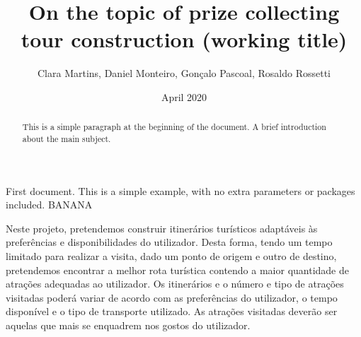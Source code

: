 \documentclass{article}
\title{On the topic of prize collecting tour construction (working title)}
\author{Clara Martins, Daniel Monteiro, Gonçalo Pascoal, Rosaldo Rossetti}
\date{April 2020}
\begin{document}
\maketitle

\begin{abstract}
This is a simple paragraph at the beginning of the 
document. A brief introduction about the main subject.
\end{abstract}

First document. This is a simple example, with no 
extra parameters or packages included. BANANA

Neste projeto, pretendemos construir itinerários turísticos adaptáveis às preferências e disponibilidades do utilizador. Desta forma, tendo um tempo limitado para realizar a visita, dado um ponto de origem e outro de destino, pretendemos encontrar a melhor rota turística contendo a maior quantidade de atrações adequadas ao utilizador.
    Os itinerários e o número e tipo de atrações visitadas poderá variar de acordo com as preferências do utilizador, o tempo disponível e o tipo de transporte utilizado. As atrações visitadas deverão ser aquelas que mais se enquadrem nos gostos do utilizador.
\end{document}
